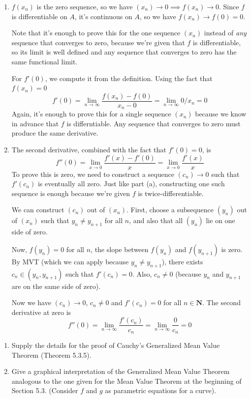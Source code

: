 \documentclass{oxmathproblems}
\begin{document}
\begin{questions}
\begin{solution}
  \begin{enumerate}[label=(\alph*)]
    \item $f(x_{n})$ is the zero sequence, so we have $(x_{n}) \to 0 \implies f(x_{n}) \to 0$. Since $f$ is differentiable on $A$, it's continuous on $A$, so we have
    $f(x_{n}) \to f(0) = 0$.

    Note that it's enough to prove this for the one sequence $(x_{n})$ instead of \textit{any} sequence that converges to zero, because we're given that $f$ is differentiable,
    so its limit is well defined and any sequence that converges to zero has the same functional limit.

    For $f'(0)$, we compute it from the definition. Using the fact that $f(x_{n})=0$
    \[f'(0)=\lim_{n \to \infty}\frac{f(x_{n})-f(0)}{x_{n}-0}=\lim_{n \to \infty}0/x_{n}=0\]
    Again, it's enough to prove this for a single sequence $(x_{n})$ because we know in advance that $f$ is differntiable. Any sequence that converges to zero must produce the
    same derivative.

    \item The second derivative, combined with the fact that $f'(0)=0$, is
    \[f''(0)=\lim_{x \to 0}\frac{f'(x)-f'(0)}{x}=\lim_{x \to 0}\frac{f'(x)}{x}\]
    To prove this is zero, we need to construct a sequence $(c_{n}) \to 0$ such that $f'(c_{n})$ is eventually all zero. Just like part (a), constructing one such sequence is enough
    because we're given $f$ is twice-differentiable.

    We can construct $(c_{n})$ out of $(x_{n})$. First, choose a subsequence $(y_{n})$ out of $(x_{n})$ such that $y_{n} \neq y_{n+1}$
    for all $n$, and also that all $(y_{n})$ lie on one side of zero.
    
    Now, $f(y_{n}) = 0$ for all $n$, the slope between $f(y_{n})$ and $f(y_{n+1})$ is zero.
    By MVT (which we can apply because $y_{n} \neq y_{n+1}$), there exists $c_{n} \in (y_{n}, y_{n+1})$ such that $f'(c_{n})=0$. Also, $c_{n} \neq 0$
    (because $y_{n}$ and $y_{n+1}$ are on the same side of zero).

    Now we have $(c_{n}) \to 0$, $c_{n} \neq 0$ and $f'(c_{n})=0$ for all $n \in \textbf{N}$. The second derivative at zero is
    \[f''(0)=\lim_{n \to \infty}\frac{f'(c_{n})}{c_{n}} = \lim_{n \to \infty} \frac{0}{c_{n}} = 0\]
  \end{enumerate}
\end{solution}

\miquestion
\begin{enumerate}[label=(\alph*)]
  \item Supply the details for the proof of Cauchy's Generalized Mean Value Theorem (Theorem 5.3.5).
  \item Give a graphical interpretation of the Generalized Mean Value Theorem analogous to the one given for the Mean Value Theorem at the beginning of Section 5.3.
  (Consider $f$ and $g$ as parametric equations for a curve). 
\end{enumerate}


\end{questions}
\end{document}
